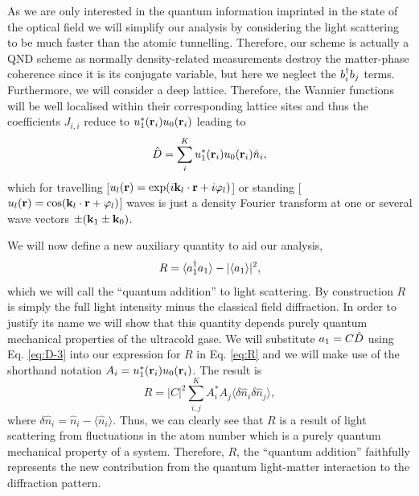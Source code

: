As we are only interested in the quantum information imprinted in the
state of the optical field we will simplify our analysis by
considering the light scattering to be much faster than the atomic
tunnelling. Therefore, our scheme is actually a QND scheme
\cite{rogers2014, mekhov2007prl, mekhov2007pra, eckert2008} as
normally density-related measurements destroy the matter-phase
coherence since it is its conjugate variable, but here we neglect the
$b^\dagger_i b_j$ terms. Furthermore, we will consider a deep
lattice. Therefore, the Wannier functions will be well localised
within their corresponding lattice sites and thus the coefficients
$J_{i,i}$ reduce to $u_1^*(\mathbf{r}_i) u_0(\mathbf{r}_i)$ leading to
\begin{equation}
  \label{eq:D-3}
  \hat{D}=\sum_i^K u_1^*(\mathbf{r}_i) u_0(\mathbf{r}_i) \hat{n}_i,
\end{equation} 
which for travelling
[$u_l(\mathbf{r})=\exp(i \mathbf{k}_l \cdot \mathbf{r}+i\varphi_l)$] or standing
[$u_l(\mathbf{r})=\cos(\mathbf{k}_l \cdot \mathbf{r}+\varphi_l)$] waves is just a
density Fourier transform at one or several wave vectors
$\pm(\mathbf{k}_1 \pm \mathbf{k}_0)$. 

We will now define a new auxiliary quantity to aid our analysis,
\begin{equation}
  \label{eq:R}
  R = \langle a^\dagger_1 a_1 \rangle - | \langle a_1 \rangle |^2,
\end{equation}
which we will call the ``quantum addition'' to light scattering. By
construction $R$ is simply the full light intensity minus the
classical field diffraction. In order to justify its name we will show
that this quantity depends purely quantum mechanical properties of the
ultracold gase. We will substitute $a_1 = C \hat{D}$ using
Eq. \eqref{eq:D-3} into our expression for $R$ in Eq. \eqref{eq:R} and
we will make use of the shorthand notation
$A_i = u_1^*(\mathbf{r}_i) u_0(\mathbf{r}_i)$. The result is
\begin{equation}
  \label{eq:Rfluc}
  R = |C|^2 \sum_{i,j}^K A^*_i A_j \langle \delta \hat{n}_i \delta
  \hat{n}_j \rangle,
\end{equation}
where $\delta \hat{n}_i = \hat{n}_i - \langle \hat{n}_i
\rangle$. Thus, we can clearly see that $R$ is a result of light
scattering from fluctuations in the atom number which is a purely
quantum mechanical property of a system. Therefore, $R$, the ``quantum
addition'' faithfully represents the new contribution from the quantum
light-matter interaction to the diffraction pattern.

